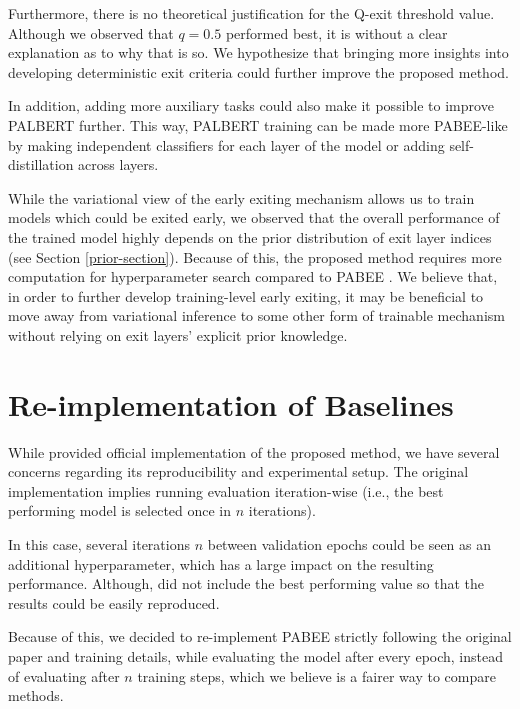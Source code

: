 \documentclass{article}
\begin{document}
Furthermore, there is no theoretical justification for the Q-exit threshold value. Although we observed that $q=0.5$ performed best, it is without a clear explanation as to why that is so. We hypothesize that bringing more insights into developing deterministic exit criteria could further improve the proposed method.

In addition, adding more auxiliary tasks could also make it possible to improve PALBERT further. This way, PALBERT training can be made more PABEE-like by making independent classifiers for each layer of the model or adding self-distillation across layers.

While the variational view of the early exiting mechanism allows us to train models which could be exited early, we observed that the overall performance of the trained model highly depends on the prior distribution of exit layer indices (see Section \ref{prior-section}). Because of this, the proposed method requires more computation for hyperparameter search compared to PABEE \citep{pabee}. We believe that, in order to further develop training-level early exiting, it may be beneficial to move away from variational inference to some other form of trainable mechanism without relying on exit layers' explicit prior knowledge.









\appendix
\section{Re-implementation of Baselines}
\label{reimplement-section}
While \citet{pabee} provided official implementation of the proposed method, we have several concerns regarding its reproducibility and experimental setup. The original implementation implies running evaluation iteration-wise (i.e., the best performing model is selected once in $n$ iterations). 

In this case, several iterations $n$ between validation epochs could be seen as an additional hyperparameter, which has a large impact on the resulting performance. Although, \citet{pabee} did not include the best performing value so that the results could be easily reproduced. 

Because of this, we decided to re-implement PABEE strictly following the original paper and training details, while evaluating the model after every epoch, instead of evaluating after $n$ training steps, which we believe is a fairer way to compare methods.
\end{document}
